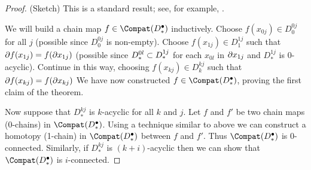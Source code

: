 \begin{proof}
(Sketch)
This is a standard result; see, for example, \cite[Chapter 4]{MR0210112}.

We will build a chain map $f\in \Compat(D^\bullet_*)$ inductively.
Choose $f(x_{0j})\in D^{0j}_0$ for all $j$
(possible since $D^{0j}_0$ is non-empty).
Choose $f(x_{1j})\in D^{1j}_1$ such that $\partial f(x_{1j}) = f(\partial x_{1j})$
(possible since $D^{0l}_* \subset D^{1j}_*$ for each $x_{0l}$ in $\partial x_{1j}$
and $D^{1j}_*$ is 0-acyclic).
Continue in this way, choosing $f(x_{kj})\in D^{kj}_k$ such that $\partial f(x_{kj}) = f(\partial x_{kj})$
We have now constructed $f\in \Compat(D^\bullet_*)$, proving the first claim of the theorem.

Now suppose that $D^{kj}_*$ is $k$-acyclic for all $k$ and $j$.
Let $f$ and $f'$ be two chain maps (0-chains) in $\Compat(D^\bullet_*)$.
Using a technique similar to above we can construct a homotopy (1-chain) in $\Compat(D^\bullet_*)$
between $f$ and $f'$.
Thus $\Compat(D^\bullet_*)$ is 0-connected.
Similarly, if $D^{kj}_*$ is $(k{+}i)$-acyclic then we can show that $\Compat(D^\bullet_*)$ is $i$-connected.
\end{proof}

